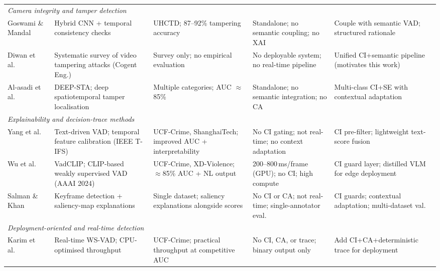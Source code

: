 \documentclass[a4paper,fleqn]{cas-dc}
\begin{document}
\begin{table}[t]
\begin{tabularx}{\textwidth}{p{2.2cm} X X X X}
\multicolumn{5}{l}{\textit{Camera integrity and tamper detection}} \\[1pt]
 
Goswami \& Mandal~\citep{goswami2023hybrid}
  & Hybrid CNN + temporal consistency checks
  & UHCTD; 87--92\% tampering accuracy
  & Standalone; no semantic coupling; no XAI
  & Couple with semantic VAD; structured rationale \\
 
Diwan et al.~\citep{diwan2024systematic}
  & Systematic survey of video tampering attacks (Cogent Eng.)
  & Survey only; no empirical evaluation
  & No deployable system; no real-time pipeline
  & Unified CI+semantic pipeline (motivates this work) \\
 
Al-asadi et al.~\citep{deepsta2024}
  & DEEP-STA; deep spatiotemporal tamper localisation
  & Multiple categories; AUC $\approx$85\%
  & Standalone; no semantic integration; no CA
  & Multi-class CI+SE with contextual adaptation \\[3pt]
 
\multicolumn{5}{l}{\textit{Explainability and decision-trace methods}} \\[1pt]
 
Yang et al.~\citep{yang2024textvad}
  & Text-driven VAD; temporal feature calibration (IEEE T-IFS)
  & UCF-Crime, ShanghaiTech; improved AUC + interpretability
  & No CI gating; not real-time; no context adaptation
  & CI pre-filter; lightweight text-score fusion \\
 
Wu et al.~\citep{wu2024vadclip}
  & VadCLIP; CLIP-based weakly supervised VAD (AAAI 2024)
  & UCF-Crime, XD-Violence; $\approx$85\% AUC + NL output
  & 200--800\,ms/frame (GPU); no CI; high compute
  & CI guard layer; distilled VLM for edge deployment \\
 
Salman \& Khan~\citep{salman2025explainable}
  & Keyframe detection + saliency-map explanations
  & Single dataset; saliency explanations alongside scores
  & No CI or CA; not real-time; single-annotator eval.
  & CI guards; contextual adaptation; multi-dataset val. \\[3pt]
 
\multicolumn{5}{l}{\textit{Deployment-oriented and real-time detection}} \\[1pt]
 
Karim et al.~\citep{karim2024real}
  & Real-time WS-VAD; CPU-optimised throughput
  & UCF-Crime; practical throughput at competitive AUC
  & No CI, CA, or trace; binary output only
  & Add CI+CA+deterministic trace for deployment \\
 

\end{tabularx}
\end{table}
\end{document}
